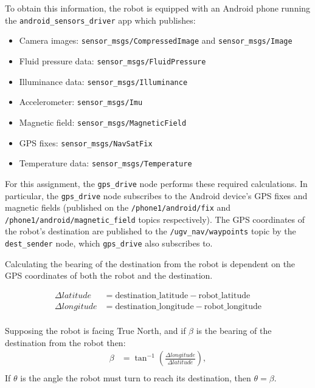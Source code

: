 \documentclass[titlepage,12pt,a4paper]{article}
\begin{document}
To obtain this information, the robot is equipped with an Android phone running the \verb|android_sensors_driver| app which publishes:

\begin{itemize}
	\item Camera images: \verb|sensor_msgs/CompressedImage| and \verb|sensor_msgs/Image|
	\item Fluid pressure data: \verb|sensor_msgs/FluidPressure|
	\item Illuminance data: \verb|sensor_msgs/Illuminance|
	\item Accelerometer: \verb|sensor_msgs/Imu|
	\item Magnetic field: \verb|sensor_msgs/MagneticField|
	\item GPS fixes: \verb|sensor_msgs/NavSatFix|
	\item Temperature data: \verb|sensor_msgs/Temperature| \\
\end{itemize}

For this assignment, the \verb|gps_drive| node performs these required calculations. In particular, the \verb|gps_drive| node subscribes to the Android device's GPS fixes and magnetic fields (published on the \verb|/phone1/android/fix| and \verb|/phone1/android/magnetic_field| topics respectively). The GPS coordinates of the robot's destination are published to the  \verb|/ugv_nav/waypoints| topic by the \verb|dest_sender| node, which \verb|gps_drive| also subscribes to.

Calculating the bearing of the destination from the robot is dependent on the GPS coordinates of both the robot and the destination.

\begin{align*}
	\Delta{latitude}   	&= 	\text{destination\_latitude} - \text{robot\_latitude} \\
	\Delta{longitude}	&= 	\text{destination\_longitude} - \text{robot\_longitude} \\
\end{align*}

Supposing the robot is facing True North, and if $\beta$ is the bearing of the destination from the robot then:
\begin{align*}
	\beta		&=	\tan^{-1}({\frac{\Delta{longitude}}{\Delta{latitude}}}),\\
\end{align*}
If $\theta$ is the angle the robot must turn to reach its destination, then $\theta = \beta$.
\end{document}
